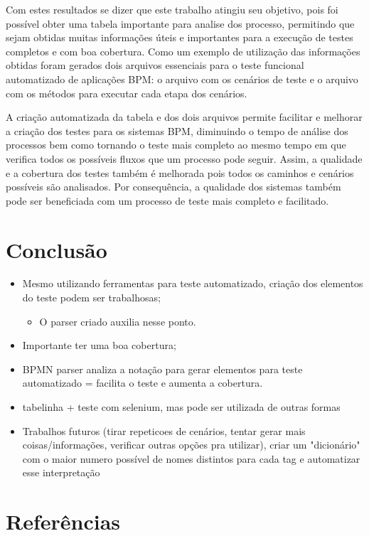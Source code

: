 \documentclass[12pt]{article}
\begin{document}






Com estes resultados se dizer que este trabalho atingiu seu objetivo, pois foi possível obter uma tabela importante para analise dos processo, permitindo que sejam obtidas muitas informações úteis e importantes para a execução de testes completos e com boa cobertura. Como um exemplo de utilização das informações obtidas foram gerados dois arquivos essenciais para o teste funcional automatizado de aplicações BPM: o arquivo com os cenários de teste e o arquivo com os métodos para executar cada etapa dos cenários.

A criação automatizada da tabela e dos dois arquivos permite facilitar e melhorar a criação dos testes para os sistemas BPM, diminuindo o tempo de análise dos processos bem como tornando o teste mais completo ao mesmo tempo em que verifica todos os possíveis fluxos que um processo pode seguir. Assim, a qualidade e a cobertura dos testes também é melhorada pois todos os caminhos e cenários possíveis são analisados. Por consequência, a qualidade dos sistemas também pode ser beneficiada com um processo de teste mais completo e facilitado.

\section{Conclusão}
\begin{itemize}
\item Mesmo utilizando ferramentas para teste automatizado, criação dos elementos do teste podem ser trabalhosas;
\begin{itemize}
\item O parser criado auxilia nesse ponto.
\end{itemize}
\item Importante ter uma boa cobertura;
\item BPMN parser analiza a notação para gerar elementos para teste automatizado = facilita o teste e aumenta a cobertura.
\item tabelinha + teste com selenium, mas pode ser utilizada de outras formas 
\item Trabalhos futuros (tirar repeticoes de cenários, tentar gerar mais coisas/informações, verificar outras opções pra utilizar), criar um "dicionário" com o maior numero possível de nomes distintos para cada tag e automatizar esse interpretação
\end{itemize}

\section{Referências}



\end{document}
